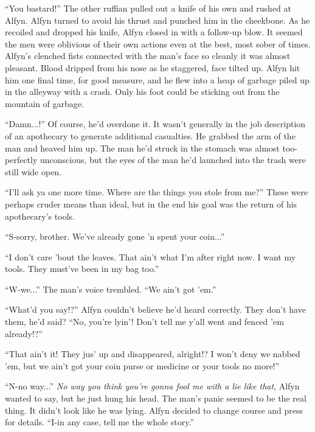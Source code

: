 ``You bastard!'' The other ruffian pulled out a knife of his own and rushed at Alfyn. Alfyn turned to avoid his thrust and punched him in the cheekbone. As he recoiled and dropped his knife, Alfyn closed in with a follow-up blow. It seemed the men were oblivious of their own actions even at the best, most sober of times. Alfyn's clenched fists connected with the man's face so cleanly it was almost pleasant. Blood dripped from his nose as he staggered, face tilted up. Alfyn hit him one final time, for good measure, and he flew into a heap of garbage piled up in the alleyway with a crash. Only his foot could be sticking out from the mountain of garbage.

``Damn...!'' Of course, he'd overdone it. It wasn't generally in the job description of an apothecary to generate additional casualties. He grabbed the arm of the man and heaved him up. The man he'd struck in the stomach was almost too-perfectly unconscious, but the eyes of the man he'd launched into the trash were still wide open.

``I'll ask ya one more time. Where are the things you stole from me?'' These were perhaps cruder means than ideal, but in the end his goal was the return of his apothecary's tools. 

``S-sorry, brother. We've already gone 'n spent your coin...''

``I don't care 'bout the leaves. That ain't what I'm after right now. I want my tools. They must've been in my bag too.''

``W-we...'' The man's voice trembled. ``We ain't got 'em.''

``What'd you say!?'' Alfyn couldn't believe he'd heard correctly. They don't have them, he'd said? ``No, you're lyin'! Don't tell me y'all went and fenced 'em already!?''

``That ain't it! They jus' up and disappeared, alright!? I won't deny we nabbed 'em, but we ain't got your coin purse or medicine or your tools no more!''

``N-no way...'' \emph{No way you think you're gonna fool me with a lie like that}, Alfyn wanted to say, but he just hung his head. The man's panic seemed to be the real thing. It didn't look like he was lying. Alfyn decided to change course and press for details. ``I-in any case, tell me the whole story.''

